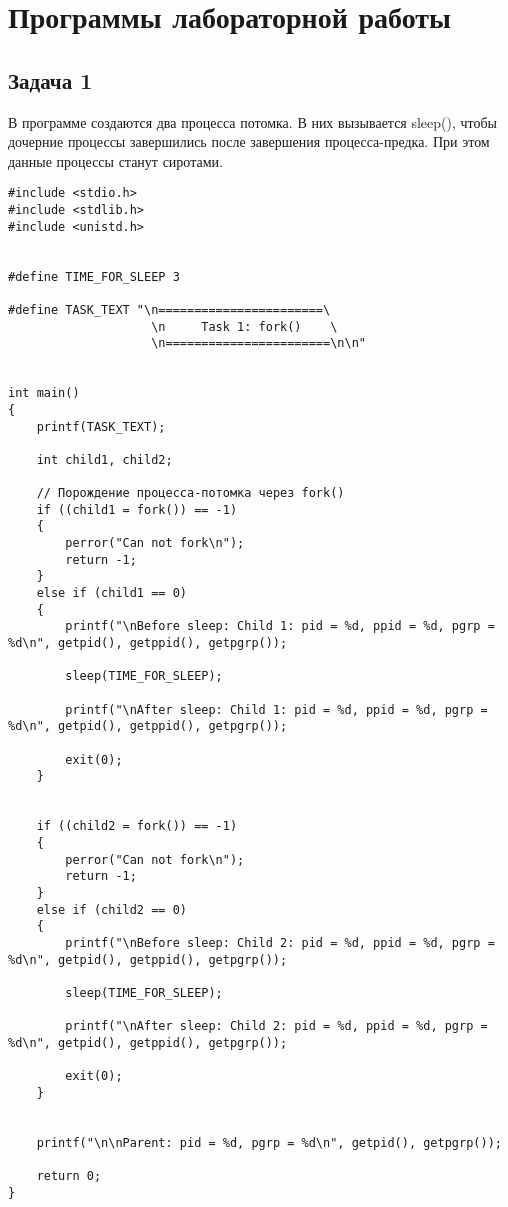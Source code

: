 \setcounter{page}{2}

\section*{Программы лабораторной работы}

\subsection*{Задача 1} 
В программе создаются два процесса потомка. В них вызывается sleep(), чтобы дочерние процессы завершились после завершения процесса-предка. При этом данные процессы станут сиротами.


\begin{lstlisting}[style={asm},label=lst:fork,caption=Вызов fork()]
#include <stdio.h>
#include <stdlib.h>
#include <unistd.h>


#define TIME_FOR_SLEEP 3

#define TASK_TEXT "\n=======================\
                    \n     Task 1: fork()    \
                    \n=======================\n\n"


int main()
{
    printf(TASK_TEXT);
    
    int child1, child2;

    // Порождение процесса-потомка через fork()
    if ((child1 = fork()) == -1)
    {
        perror("Can not fork\n");
        return -1;
    }
    else if (child1 == 0)
    {   
        printf("\nBefore sleep: Child 1: pid = %d, ppid = %d, pgrp = %d\n", getpid(), getppid(), getpgrp());

        sleep(TIME_FOR_SLEEP);

        printf("\nAfter sleep: Child 1: pid = %d, ppid = %d, pgrp = %d\n", getpid(), getppid(), getpgrp());

        exit(0);
    }


    if ((child2 = fork()) == -1)
    {
        perror("Can not fork\n");
        return -1;
    }
    else if (child2 == 0)
    {
        printf("\nBefore sleep: Child 2: pid = %d, ppid = %d, pgrp = %d\n", getpid(), getppid(), getpgrp());

        sleep(TIME_FOR_SLEEP);

        printf("\nAfter sleep: Child 2: pid = %d, ppid = %d, pgrp = %d\n", getpid(), getppid(), getpgrp());

        exit(0);
    }


    printf("\n\nParent: pid = %d, pgrp = %d\n", getpid(), getpgrp());

    return 0;
}
\end{lstlisting}

